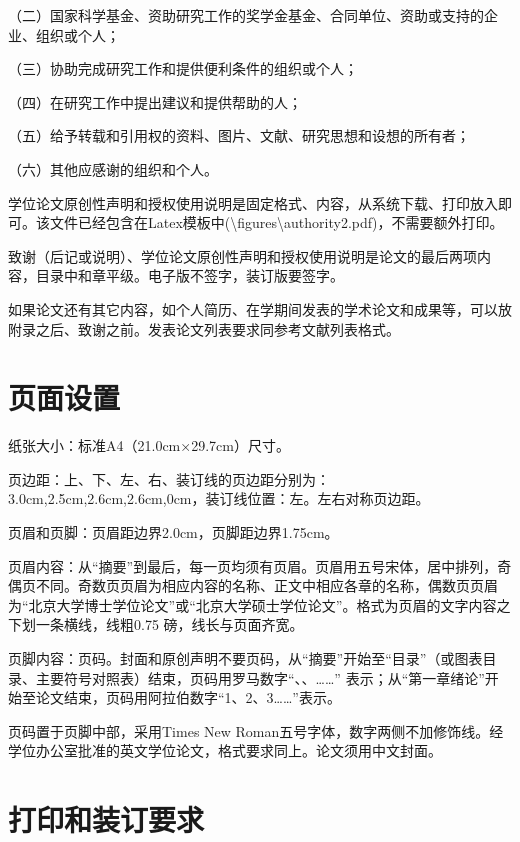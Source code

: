 （二）国家科学基金、资助研究工作的奖学金基金、合同单位、资助或支持的企业、组织或个人；

（三）协助完成研究工作和提供便利条件的组织或个人；

（四）在研究工作中提出建议和提供帮助的人；

（五）给予转载和引用权的资料、图片、文献、研究思想和设想的所有者；

（六）其他应感谢的组织和个人。

学位论文原创性声明和授权使用说明是固定格式、内容，从系统下载、打印放入即可。该文件已经包含在Latex模板中(\textbackslash figures\textbackslash authority2.pdf)，不需要额外打印。

致谢（后记或说明）、学位论文原创性声明和授权使用说明是论文的最后两项内容，目录中和章平级。电子版不签字，装订版要签字。

如果论文还有其它内容，如个人简历、在学期间发表的学术论文和成果等，可以放附录之后、致谢之前。发表论文列表要求同参考文献列表格式。

\section{页面设置}
纸张大小：标准A4（21.0cm×29.7cm）尺寸。

页边距：上、下、左、右、装订线的页边距分别为：3.0cm,2.5cm,2.6cm,2.6cm,0cm，装订线位置：左。左右对称页边距。

页眉和页脚：页眉距边界2.0cm，页脚距边界1.75cm。

页眉内容：从“摘要”到最后，每一页均须有页眉。页眉用五号宋体，居中排列，奇偶页不同。奇数页页眉为相应内容的名称、正文中相应各章的名称，偶数页页眉为“北京大学博士学位论文”或“北京大学硕士学位论文”。格式为页眉的文字内容之下划一条横线，线粗0.75 磅，线长与页面齐宽。

页脚内容：页码。封面和原创声明不要页码，从“摘要”开始至“目录”（或图表目录、主要符号对照表）结束，页码用罗马数字“\uppercase\expandafter{}、\uppercase\expandafter{}、\uppercase\expandafter{}……” 表示；从“第一章绪论”开始至论文结束，页码用阿拉伯数字“1、2、3……”表示。

页码置于页脚中部，采用Times New Roman五号字体，数字两侧不加修饰线。经学位办公室批准的英文学位论文，格式要求同上。论文须用中文封面。

\section[打印和装订要求]{打印和装订要求\protect{}}

